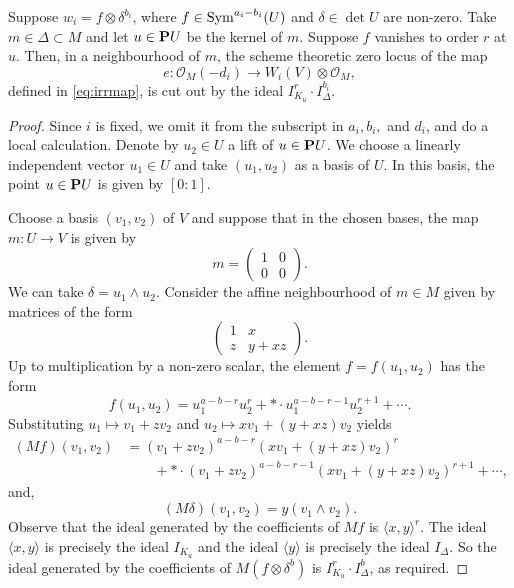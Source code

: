 \documentclass{amsart}
\renewcommand{\O}{\mathcal O}
\begin{document}
\begin{proposition}\label{prop:zerolocus}
  Suppose \(w_i = f \otimes \delta^{b_i}\), where \(f \in \Sym^{a_i-b_i}(U)\) and \(\delta \in \det U\) are non-zero.
  Take \(m \in \Delta \subset M\)  and let \(u \in \P U\) be the kernel of \(m\).
    Suppose \(f\) vanishes to order \(r\) at \(u\).
  Then, in a neighbourhood of \(m\), the scheme theoretic zero locus of the map 
  \[ e \colon \O_M(-d_i) \to W_i(V) \otimes \O_M,\]
  defined in \eqref{eq:irrmap}, is cut out by the ideal \(I_{K_{u}}^r \cdot I_{\Delta}^{b_i}\).
\end{proposition}
\begin{proof}
 Since \(i\) is fixed, we omit it from the subscript in \(a_i, b_i,\) and \(d_i\), and do a local calculation.
  Denote by \(u_{2} \in U\) a lift of \(u \in \P U\).
  We choose a linearly independent vector \(u_{1} \in U\) and take \((u_{1},u_{2})\) as a basis of \(U\).
  In this basis, the point \(u \in \P U\) is given by \([0:1]\).

  Choose a basis \((v_{1},v_{2})\) of \(V\) and suppose that in the chosen bases, the map \(m \colon U \to V\)  is given by
  \[ m = \begin{pmatrix} 1 & 0 \\ 0 & 0 \end{pmatrix}.\]
   We can take \(\delta = u_1 \wedge u_2\).
  Consider the affine neighbourhood of \(m \in M\) given by matrices of the form
  \[ \begin{pmatrix} 1 & x \\ z & y+xz \end{pmatrix}.\]
  Up to multiplication by a non-zero scalar, the element \(f = f(u_1,u_2)\) has the form
  \begin{equation}\label{eq:p}
    f(u_1,u_2) = u_{1}^{a-b-r}u_{2}^{r} + * \cdot u_{1}^{a-b-r-1}u_{2}^{r+1} + \cdots.
  \end{equation}
  Substituting \(u_{1} \mapsto v_{1} + z v_{2}\) and \(u_{2} \mapsto xv_{1}+(y+xz)v_{2}\) yields
  \begin{equation}\label{eqn:pex}
    \begin{split}
      (Mf)(v_1,v_{2}) &= (v_1+zv_2)^{a-b-r}(xv_{1}+(y+xz)v_{2})^{r}  \\
      & \qquad + * \cdot (v_{1}+zv_{2})^{a-b-r-1}(xv_{1}+(y+xz)v_{2})^{r+1}+\cdots,
    \end{split}
  \end{equation}
  and,
  \begin{equation}\label{eqn:pexdet}
    (M \delta)(v_1,v_2) = y (v_1 \wedge v_2).
  \end{equation}
  Observe that the ideal generated by the coefficients of \(Mf\) is \(\langle  x,y \rangle^{r}\).
  The ideal \(\langle  x,y \rangle\) is precisely the ideal \(I_{K_{u}}\) and the ideal \(\langle y \rangle\) is precisely the ideal \(I_{\Delta}\).
  So the ideal generated by the coefficients of \(M(f \otimes \delta^b)\) is \(I_{K_u}^{r} \cdot I_{\Delta}^{b}\), as required.
\end{proof}
\end{document}
